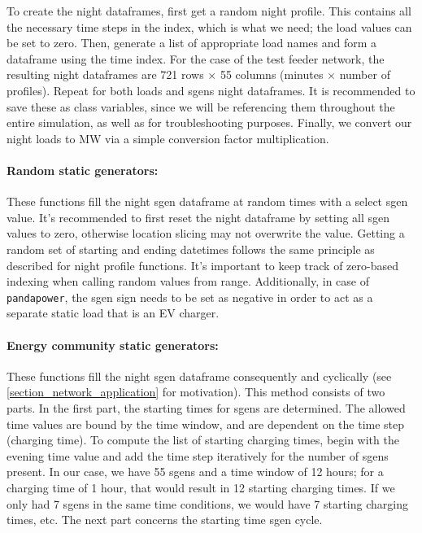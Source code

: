\documentclass[a4paper,10pt]{report}
\begin{document}
To create the night dataframes, first get a random night profile. This contains all the necessary time steps in the index, which is what we need; the load values can be set to zero. Then, generate a list of appropriate load names and form a dataframe using the time index. For the case of the test feeder network, the resulting night dataframes are 721 rows $\times$ 55 columns (minutes $\times$ number of profiles). Repeat for both loads and sgens night dataframes. It is recommended to save these as class variables, since we will be referencing them throughout the entire simulation, as well as for troubleshooting purposes. Finally, we convert our night loads to MW via a simple conversion factor multiplication.

\paragraph{Random static generators:} These functions fill the night sgen dataframe at random times with a select sgen value. It's recommended to first reset the night dataframe by setting all sgen values to zero, otherwise location slicing may not overwrite the value. Getting a random set of starting and ending datetimes follows the same principle as described for night profile functions. It's important to keep track of zero-based indexing when calling random values from range. Additionally, in case of \texttt{pandapower}, the sgen sign needs to be set as negative in order to act as a separate static load that is an EV charger.

\paragraph{Energy community static generators:} These functions fill the night sgen dataframe consequently and cyclically (see \cref{section_network_application} for motivation). This method consists of two parts. In the first part, the starting times for sgens are determined. The allowed time values are bound by the time window, and are dependent on the time step (charging time). To compute the list of starting charging times, begin with the evening time value and add the time step iteratively for the number of sgens present. In our case, we have 55 sgens and a time window of 12 hours; for a charging time of 1 hour, that would result in 12 starting charging times. If we only had 7 sgens in the same time conditions, we would have 7 starting charging times, etc. The next part concerns the starting time sgen cycle.
\end{document}
